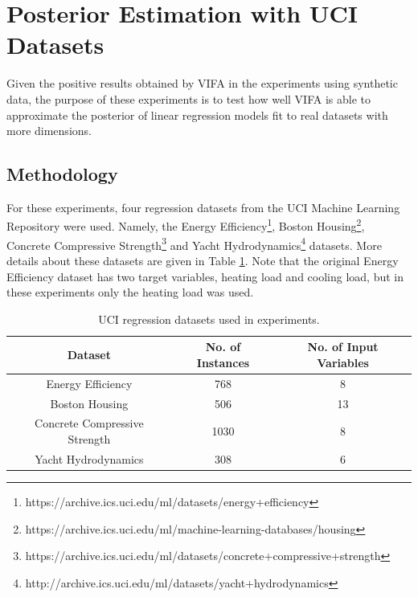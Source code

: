\documentclass[msc,deptreport.inf]{infthesis} %
\begin{document}
\section{Posterior Estimation with UCI Datasets}

Given the positive results obtained by VIFA in the experiments using synthetic data, the purpose of these experiments is to test how well VIFA is able to approximate the posterior of linear regression models fit to real datasets with more dimensions. 

\subsection{Methodology}

For these experiments, four regression datasets from the UCI Machine Learning Repository \cite{dua2019} were used. Namely, the Energy Efficiency\footnote{https://archive.ics.uci.edu/ml/datasets/energy+efficiency}, Boston Housing\footnote{https://archive.ics.uci.edu/ml/machine-learning-databases/housing}, Concrete Compressive Strength\footnote{https://archive.ics.uci.edu/ml/datasets/concrete+compressive+strength} and Yacht Hydrodynamics\footnote{http://archive.ics.uci.edu/ml/datasets/yacht+hydrodynamics} datasets. More details about these datasets are given in Table \ref{table:uci_datasets}. Note that the original Energy Efficiency dataset has two target variables, heating load and cooling load, but in these experiments only the heating load was used. 

\begin{table}[h!]
	\begin{center}
		\begin{tabular}{||c c c ||} 
			\hline
 			Dataset & No. of Instances & No. of Input Variables \\ [0.5ex] 
			\hline\hline
			Energy Efficiency & 768 & 8 \\
 			\hline
 			Boston Housing & 506 & 13 \\ 
 			\hline
 			Concrete Compressive Strength & 1030 & 8 \\
 			\hline
 			Yacht Hydrodynamics & 308 & 6 \\ [1ex] 
 			\hline
		\end{tabular}
		\caption{UCI regression datasets used in experiments.}
		\label{table:uci_datasets}
	\end{center}
\end{table}
\end{document}
